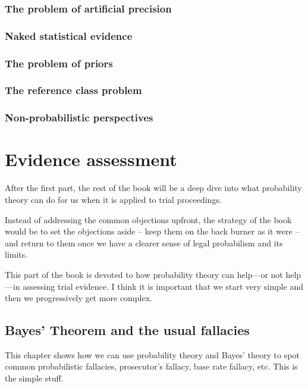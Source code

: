 \documentclass[]{book}
\begin{document}
\section{The problem of artificial precision}

\section{Naked statistical evidence}\label{sec:naked}

\section{The problem of priors}

\section{The reference class problem}

\section{Non-probabilistic perspectives}

\part{Evidence assessment}

After the first part, the rest of the book will be a deep dive into what
probability theory can do for us when it is applied to trial
proceedings.

Instead of addressing the common objections upfront, the strategy of the
book would be to set the objections aside -- keep them on the back
burner as it were -- and return to them once we have a clearer sense of
legal probabilism and its limits.


This part of the book is devoted to how probability theory can help---or
not help---in assessing trial evidence. I think it is important that we
start very simple and then we progressively get more complex.

\chapter{Bayes' Theorem and the usual fallacies}

This chapter shows how we can use probability theory and Bayes' theory
to spot common probabilistic fallacies, prosecutor's fallacy, base rate
fallacy, etc. This is the simple stuff.
\end{document}
